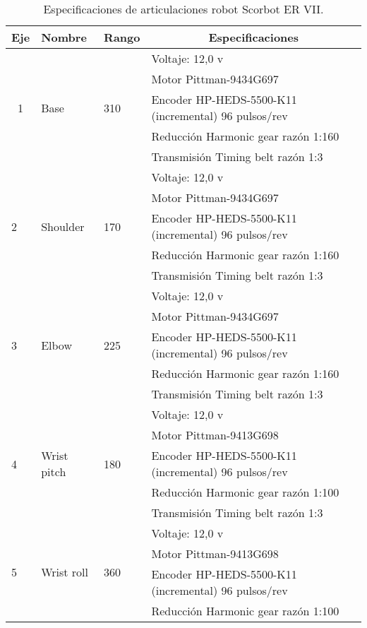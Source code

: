 \begin{table}[]
\centering
\begin{tabular}{|l|l|l|l|}
\hline
\multicolumn{1}{|c|}{\textbf{Eje}} & \textbf{Nombre} & \textbf{Rango} & \multicolumn{1}{c|}{\textbf{Especificaciones}} \\ \hline
\multicolumn{1}{|c|}{\multirow{5}{*}{1}} & \multirow{5}{*}{Base} & \multirow{5}{*}{310} & Voltaje: 12,0 v \\ \cline{4-4} 
\multicolumn{1}{|c|}{} &  &  & Motor Pittman-9434G697 \\ \cline{4-4} 
\multicolumn{1}{|c|}{} &  &  & Encoder HP-HEDS-5500-K11 (incremental) 96 pulsos/rev \\ \cline{4-4} 
\multicolumn{1}{|c|}{} &  &  & Reducción Harmonic gear razón 1:160 \\ \cline{4-4} 
\multicolumn{1}{|c|}{} &  &  & Transmisión Timing belt razón 1:3 \\ \hline
\multirow{5}{*}{2} & \multirow{5}{*}{Shoulder} & \multirow{5}{*}{170} & Voltaje: 12,0 v \\ \cline{4-4} 
 &  &  & Motor Pittman-9434G697 \\ \cline{4-4} 
 &  &  & Encoder HP-HEDS-5500-K11 (incremental) 96 pulsos/rev \\ \cline{4-4} 
 &  &  & Reducción Harmonic gear razón 1:160 \\ \cline{4-4} 
 &  &  & Transmisión Timing belt razón 1:3 \\ \hline
\multirow{5}{*}{3} & \multirow{5}{*}{Elbow} & \multirow{5}{*}{225} & Voltaje: 12,0 v \\ \cline{4-4} 
 &  &  & Motor Pittman-9434G697 \\ \cline{4-4} 
 &  &  & Encoder HP-HEDS-5500-K11 (incremental) 96 pulsos/rev \\ \cline{4-4} 
 &  &  & Reducción Harmonic gear razón 1:160 \\ \cline{4-4} 
 &  &  & Transmisión Timing belt razón 1:3 \\ \hline
\multirow{5}{*}{4} & \multirow{5}{*}{Wrist pitch} & \multirow{5}{*}{180} & Voltaje: 12,0 v \\ \cline{4-4} 
 &  &  & Motor Pittman-9413G698 \\ \cline{4-4} 
 &  &  & Encoder HP-HEDS-5500-K11 (incremental) 96 pulsos/rev \\ \cline{4-4} 
 &  &  & Reducción Harmonic gear razón 1:100 \\ \cline{4-4} 
 &  &  & Transmisión Timing belt razón 1:3 \\ \hline
\multirow{4}{*}{5} & \multirow{4}{*}{Wrist roll} & \multirow{4}{*}{360} & Voltaje: 12,0 v \\ \cline{4-4} 
 &  &  & Motor Pittman-9413G698 \\ \cline{4-4} 
 &  &  & Encoder HP-HEDS-5500-K11 (incremental) 96 pulsos/rev \\ \cline{4-4} 
 &  &  & Reducción Harmonic gear razón 1:100 \\ \hline
\end{tabular}
\caption{Especificaciones de articulaciones robot Scorbot ER VII.}
\label{my-label}
\end{table}


